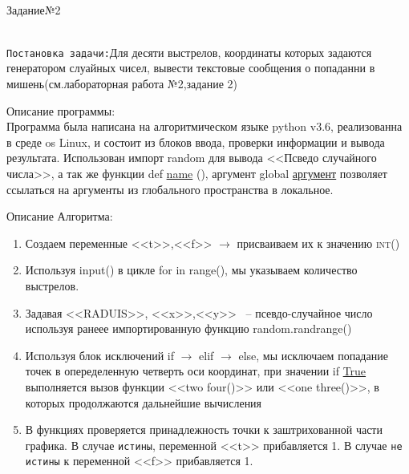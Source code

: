 \documentclass[a4paper]{article}
\begin{document}
    \begin{lab3.2}
        \begin{center}
            \underline{\hspace{6cm}}\\
            Задание№2
        \end{center}\\

        \texttt{Постановка задачи:}\hspace{5mm}Для десяти выстрелов, координаты которых задаются генератором слуайных чисел, вывести текстовые сообщения о попаданни в мишень(см.лабораторная работа №2,задание 2)
    \begin{description}
        Описание программы:\\
        Программа была написана на алгоритмическом языке python v3.6, реализованна в среде os Linux, и состоит из блоков ввода, проверки информации и вывода результата. Использован импорт random для вывода <<Псведо случайного числа>>, а так же функции
        def \underline{name} (\underline{\hspace{1mm}}), аргумент global \underline{аргумент} позволяет ссылаться на аргументы из глобального пространства в локальное.
    \end{description}
    \begin{algoritm}
        Описание Алгоритма:
        \small\begin{enumerate}
        \item Создаем переменные <<t>>,<<f>> $\to$ присваиваем их к значению \textsc{int()}
        \item Используя input() в цикле for \underline{\hspace{1mm}} in range(\underline{\hspace{1cm}}), мы указываем количество выстрелов.
        \item Задавая <<RADUIS>>, <<x>>,<<y>> ~-- псевдо-случайное число используя ранеее импортированную функцию random.randrange(\underline{\hspace{2mm}})
        \item Используя блок исключений if $\to$ elif $\to$ else, мы исключаем попадание точек в опеределенную четверть оси координат, при значении if \underline{True} выполняется вызов функции <<two four()>> или <<one three()>>, в которых продолжаются дальнейшие вычисления
        \item В функциях проверяется принадлежность точки к заштрихованной части графика. В случае \texttt{истины}, переменной <<t>> прибавляется 1. В случае \texttt{не истины} к переменной <<f>> прибавляется 1.

\end{enumerate}
\end{algoritm}
\end{lab3.2}
\end{document}
